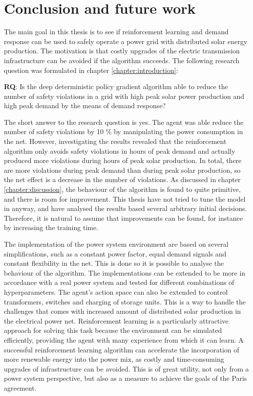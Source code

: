 \documentclass[class=book, crop=false]{standalone}
\begin{document}
\chapter{Conclusion and future work}
The main goal in this thesis is to see if reinforcement learning and demand response can be used to safely operate a power grid with distributed solar energy production. The motivation is that costly upgrades of the electric transmission infrastructure can be avoided if the algorithm succeeds. The following research question was formulated in chapter \ref{chapter:introduction}: 

\begin{displayquote}
\textbf{RQ}: Is the deep deterministic policy gradient algorithm able to reduce the number of safety violations in a grid with high peak solar power production and high peak demand by the means of demand response? 
\end{displayquote}
The short answer to the research question is yes. The agent was able reduce the number of safety violations by 10 \% by manipulating the power consumption in the net. However, investigating the results revealed that the reinforcement algorithm only avoids safety violations in hours of peak demand and actually produced more violations during hours of peak solar production. In total, there are more violations during peak demand than during peak solar production, so the net effect is a decrease in the number of violations. As discussed in chapter \ref{chapter:discussion}, the behaviour of the algorithm is found to quite primitive, and there is room for improvement. This thesis have not tried to tune the model in anyway, and have analysed the results based several arbitrary initial decisions. Therefore, it is natural to assume that improvements can be found, for instance by increasing the training time. 

The implementation of the power system environment are based on several simplifications, such as a constant power factor, equal demand signals and constant flexibility in the net. This is done so it is possible to analyse the behaviour of the algorithm. The implementations can be extended to be more in accordance with a real power system and tested for different combinations of hyperparameters. The agent's action space can also be extended to control transformers, switches and charging of storage units. This is a way to handle the challenges that comes with increased amount of distributed solar production in the electrical power net. Reinforcement learning is a particularly attractive approach for solving this task because the environment can be simulated efficiently, providing the agent with many experience from which it can learn. A successful reinforcement learning algorithm can accelerate the incorporation of more renewable energy into the power mix, as costly and time-consuming upgrades of infrastructure can be avoided. This is of great utility, not only from a power system perspective, but also as a measure to achieve the goals of the Paris agreement.
\end{document}

